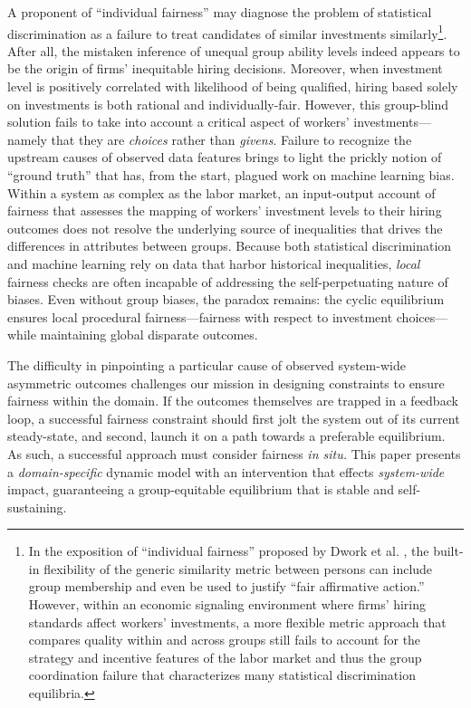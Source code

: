 \documentclass[sigconf]{acmart}
\theoremstyle{definition}
\begin{document}
A proponent of ``individual fairness'' may diagnose the problem of statistical discrimination as a failure to treat candidates of similar investments similarly\footnote{In the exposition of ``individual fairness'' proposed by Dwork et al. \cite{dwork2012fairness}, the built-in flexibility of the generic similarity metric between persons can include group membership and even be used to justify ``fair affirmative action.'' However, within an economic signaling environment where firms' hiring standards affect workers' investments, a more flexible metric approach that compares quality within and across groups still fails to account for the strategy and incentive features of the labor market and thus the group coordination failure that characterizes many statistical discrimination equilibria.}. After all, the mistaken inference of unequal group ability levels indeed appears to be the origin of firms' inequitable hiring decisions. Moreover, when investment level is positively correlated with likelihood of being qualified, hiring based solely on investments is both rational and individually-fair. However, this group-blind solution fails to take into account a critical aspect of workers' investments---namely that they are \emph{choices} rather than \emph{givens}. Failure to recognize the upstream causes of observed data features brings to light the prickly notion of ``ground truth'' that has, from the start, plagued work on machine learning bias. Within a system as complex as the labor market, an input-output account of fairness that assesses the mapping of workers' investment levels to their hiring outcomes does not resolve the underlying source of inequalities that drives the differences in attributes between groups. Because both statistical discrimination and machine learning rely on data that harbor historical inequalities, \textit{local} fairness checks are often incapable of addressing the self-perpetuating nature of biases. Even without group biases, the paradox remains: the cyclic equilibrium ensures local procedural fairness---fairness with respect to investment choices---while maintaining global disparate outcomes.

The difficulty in pinpointing a particular cause of observed system-wide asymmetric outcomes challenges our mission in designing constraints to ensure fairness within the domain. If the outcomes themselves are trapped in a feedback loop, a successful fairness constraint should first jolt the system out of its current steady-state, and second, launch it on a path towards a preferable equilibrium. As such, a successful approach must consider fairness \textit{in situ.} This paper presents a \textit{domain-specific} dynamic model with an intervention that effects \textit{system-wide} impact, guaranteeing a group-equitable equilibrium that is stable and self-sustaining. 
\end{document}
